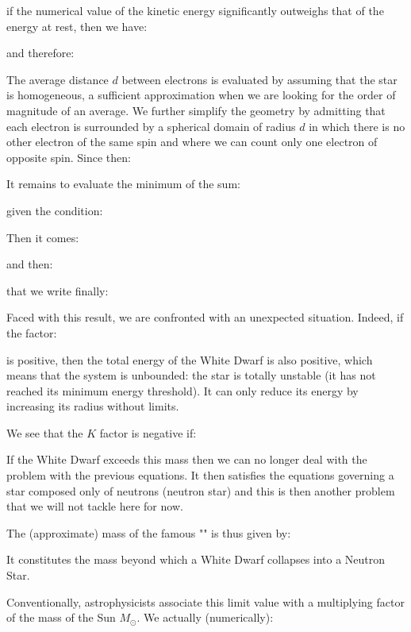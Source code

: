 	if the numerical value of the kinetic energy significantly outweighs that of the energy at rest, then we have:
	
	and therefore:
	
	The average distance $d$ between electrons is evaluated by assuming that the star is homogeneous, a sufficient approximation when we are looking for the order of magnitude of an average. We further simplify the geometry by admitting that each electron is surrounded by a spherical domain of radius $d$ in which there is no other electron of the same spin and where we can count only one electron of opposite spin. Since then:
	
	It remains to evaluate the minimum of the sum:
	
	given the condition:
	
	Then it comes:
	
	and then:
	
	that we write finally:
	
	Faced with this result, we are confronted with an unexpected situation. Indeed, if the factor:
	
	is positive, then the total energy of the White Dwarf is also positive, which means that the system is unbounded: the star is totally unstable (it has not reached its minimum energy threshold). It can only reduce its energy by increasing its radius without limits.
	
	We see that the $K$ factor is negative if:
	
	If the White Dwarf exceeds this mass then we can no longer deal with the problem with the previous equations. It then satisfies the equations governing a star composed only of neutrons (neutron star) and this is then another problem that we will not tackle here for now.

	The (approximate) mass of the famous "" is thus given by:
	
	It constitutes the mass beyond which a White Dwarf collapses into a Neutron Star.
	
	Conventionally, astrophysicists associate this limit value with a multiplying factor of the mass of the Sun $M_\odot$. We actually (numerically):
	
